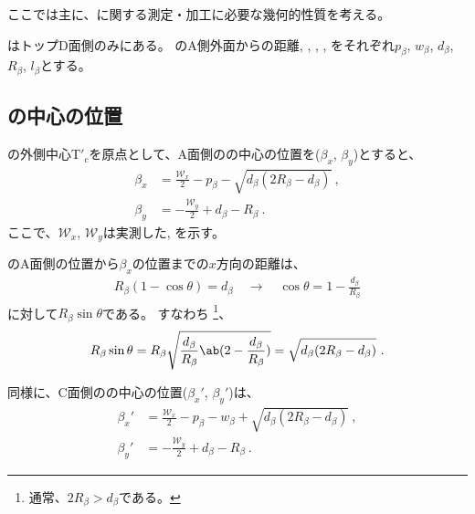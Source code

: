 

ここでは主に、\textbf{\EndFaceBoring}に関する測定・加工に必要な幾何的性質を考える。



\EndFaceBoring はトップD面側のみにある。
\EndFaceBoring のA側外面からの距離, \EndFaceBoringWidth, \EndFaceBoringDepth, \EndFaceBoringCornerR, \EndFaceBoringLength をそれぞれ$p_\beta$, $w_\beta$, $d_\beta$, $R_\beta$, $l_\beta$とする。


\subsection{\EndFaceBoringCornerR の中心の位置}
\TopEndFace の外側中心T$'_\mathrm c$を原点として、A面側の\EndFaceBoringCornerR の中心の位置を($\beta_x$, $\beta_y$)とすると、
\begin{align*}
  \beta_x &= \frac{\mathcal W_x}2-p_\beta-\sqrt{d_\beta(2R_\beta-d_\beta)}\ ,\\
  \beta_y &= -\frac{\mathcal W_y}2+d_\beta-R_\beta\ .
\end{align*}
ここで、$\mathcal W_x$, $\mathcal W_y$は実測した\TopEndACOD, \TopEndBDOD を示す。
\begin{hosoku}
\EndFaceBoring のA面側の位置から$\beta_x$の位置までの$x$方向の距離は、
\begin{align*}
  R_\beta(1-\cos\theta) = d_\beta\quad
  \longrightarrow\quad
  \cos\theta = 1-\frac{d_\beta}{R_\beta}
\end{align*}
に対して$R_\beta\sin\theta$である。
すなわち
\footnote{通常、$2R_\beta > d_\beta$である。}、
\begin{align*}
  R_\beta\sin\theta
  = R_\beta\sqrt{\frac{d_\beta}{R_\beta}\ab(2-\frac{d_\beta}{R_\beta})}
  = \sqrt{d_\beta(2R_\beta-d_\beta)}\ .
\end{align*}
\end{hosoku}
同様に、C面側の\EndFaceBoringCornerR の中心の位置($\beta_x'$, $\beta_y'$)は、
\begin{align*}
  \beta_x' &= \frac{\mathcal W_x}2-p_\beta-w_\beta+\sqrt{d_\beta(2R_\beta-d_\beta)}\ ,\\
  \beta_y' &= -\frac{\mathcal W_y}2+d_\beta-R_\beta\ .
\end{align*}



